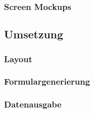    \subsubsection{Screen Mockups}

  \subsection{Umsetzung}

    \subsubsection{Layout}

    \subsubsection{Formulargenerierung}

    \subsubsection{Datenausgabe}
